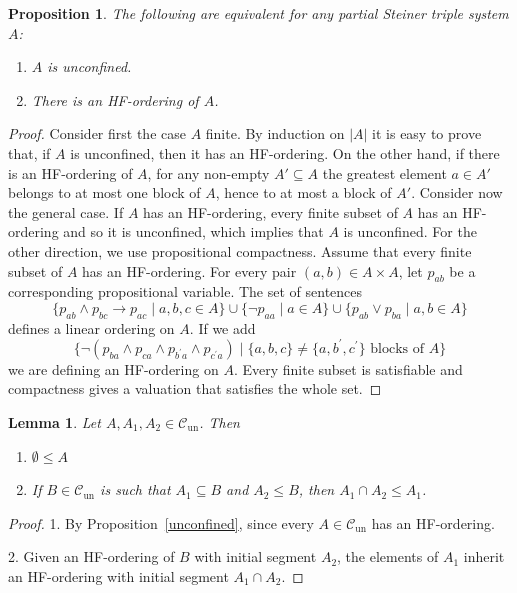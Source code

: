 \documentclass[10pt,a4paper]{article}
\newcommand{\Cun}{\mathcal{C}_\mathrm{un}}
\theoremstyle{note}
\newtheorem{lemma}[thm]{Lemma}
\newtheorem{prop}[thm]{Proposition}
\begin{document}
\begin{prop}\label{2024_nov3} The following are equivalent for any partial Steiner triple system $A$:
\begin{enumerate}
\item $A$ is unconfined.
\item There is an HF-ordering of $A$.
\end{enumerate}	
\end{prop}	
\begin{proof} Consider first the case $A$ finite. By induction on $|A|$ it is easy to prove that, if $A$ is unconfined, then it has an HF-ordering. On the other hand, if there is an HF-ordering  of $A$, for any non-empty $A' \subseteq A$ the greatest element $a\in A'$ belongs to  at most one block of $A$, hence to at most a block of $A'$. Consider now the general case. If $A$ has an HF-ordering, every finite subset of $A$ has an HF-ordering and so it is unconfined, which implies that $A$ is unconfined. For the other direction, we use propositional compactness. Assume that every finite subset  of $A$ has an HF-ordering. For every pair  $(a,b)\in A\times A$, let $p_{ab}$ be a corresponding propositional variable. The set of sentences  
$$ \{p_{ab}\wedge p_{bc}\rightarrow p_{ac}\mid a,b,c\in A\}\cup \{\neg p_{aa}\mid a\in A\}\cup \{p_{ab}\vee p_{ba}\mid a,b\in A\}$$
 defines a linear ordering on $A$. If we add 
 $$\{\neg (p_{ba}\wedge p_{ca}\wedge p_{b^\prime a}\wedge p_{c^\prime a} )\mid \{a,b,c\}\neq\{a,b^\prime,c^\prime\} \text{ blocks of } A\}$$ 
 we are defining an HF-ordering on $A$. Every finite subset is satisfiable and compactness gives a valuation that satisfies the whole set.
\end{proof}

\begin{lemma}\label{diamond} Let $A,A_1,A_2 \in \Cun$. Then
	\begin{enumerate}
		\item $\emptyset \leq A$  
	\item If $B\in \Cun$ is such that $A_1\subseteq B$ and $A_2\leq B$, then $A_1\cap A_2\leq A_1$.
	\end{enumerate}
\end{lemma}

\begin{proof} 1. By Proposition~\ref{unconfined},  since every $A\in \Cun$ has an HF-ordering.
	
	2. Given an HF-ordering of $B$ with initial segment $A_2$, the elements of $A_1$ inherit an HF-ordering with initial segment $A_1\cap A_2$.
\end{proof}
\end{document}
